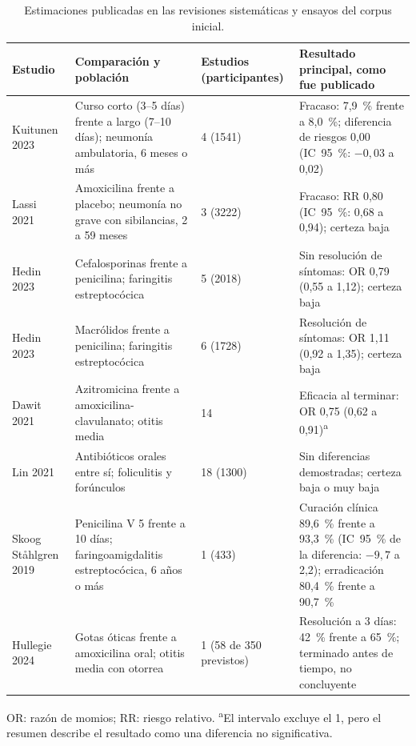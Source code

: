 \documentclass[11pt,a4paper]{article}
\begin{document}
\begin{table}[htbp]
\centering
\caption{Estimaciones publicadas en las revisiones sistemáticas y ensayos del corpus inicial.}
\label{tab:estimaciones}
\scriptsize
\begin{tabularx}{\textwidth}{@{}lXlX@{}}
\toprule
Estudio & Comparación y población & Estudios (participantes) & Resultado principal, como fue publicado \\
\midrule
Kuitunen 2023~\citep{kuitunen2023} & Curso corto (3--5 días) frente a largo (7--10 días); neumonía ambulatoria, 6 meses o más & 4 (\num{1541}) & Fracaso: 7,9~\% frente a 8,0~\%; diferencia de riesgos 0,00 (IC~95~\%: $-0{,}03$ a 0,02) \\
Lassi 2021~\citep{lassi2021} & Amoxicilina frente a placebo; neumonía no grave con sibilancias, 2 a 59 meses & 3 (\num{3222}) & Fracaso: RR 0,80 (IC~95~\%: 0,68 a 0,94); certeza baja \\
Hedin 2023~\citep{hedin2023} & Cefalosporinas frente a penicilina; faringitis estreptocócica & 5 (\num{2018}) & Sin resolución de síntomas: OR 0,79 (0,55 a 1,12); certeza baja \\
Hedin 2023~\citep{hedin2023} & Macrólidos frente a penicilina; faringitis estreptocócica & 6 (\num{1728}) & Resolución de síntomas: OR 1,11 (0,92 a 1,35); certeza baja \\
Dawit 2021~\citep{dawit2021} & Azitromicina frente a amoxicilina-clavulanato; otitis media & 14 & Eficacia al terminar: OR 0,75 (0,62 a 0,91)\textsuperscript{a} \\
Lin 2021~\citep{lin2021} & Antibióticos orales entre sí; foliculitis y forúnculos & 18 (\num{1300}) & Sin diferencias demostradas; certeza baja o muy baja \\
Skoog Ståhlgren 2019~\citep{skoog2019} & Penicilina V 5 frente a 10 días; faringoamigdalitis estreptocócica, 6 años o más & 1 (433) & Curación clínica 89,6~\% frente a 93,3~\% (IC~95~\% de la diferencia: $-9{,}7$ a 2,2); erradicación 80,4~\% frente a 90,7~\% \\
Hullegie 2024~\citep{hullegie2024} & Gotas óticas frente a amoxicilina oral; otitis media con otorrea & 1 (58 de 350 previstos) & Resolución a 3 días: 42~\% frente a 65~\%; terminado antes de tiempo, no concluyente \\
\bottomrule
\end{tabularx}

\vspace{2pt}
\begin{minipage}{0.95\textwidth}\footnotesize
OR: razón de momios; RR: riesgo relativo. \textsuperscript{a}El intervalo excluye el 1, pero el resumen describe el resultado como una diferencia no significativa.
\end{minipage}
\end{table}
\end{document}
